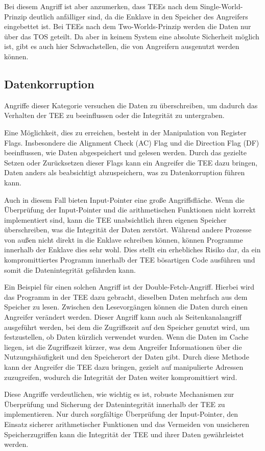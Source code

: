 Bei diesem Angriff ist aber anzumerken, dass TEEs nach dem Single-World-Prinzip deutlich anfälliger sind, da die Enklave in den Speicher des Angreifers eingebettet ist. Bei TEEs nach dem Two-Worlds-Prinzip werden die Daten nur über das TOS geteilt. Da aber in keinem System eine absolute Sicherheit möglich ist, gibt es auch hier Schwachstellen, die von Angreifern ausgenutzt werden können.

\subsection{Datenkorruption}
Angriffe dieser Kategorie versuchen die Daten zu überschreiben, um dadurch das Verhalten der TEE zu beeinflussen oder die Integrität zu untergraben.

Eine Möglichkeit, dies zu erreichen, besteht in der Manipulation von Register Flags. Insbesondere die Alignment Check (AC) Flag und die Direction Flag (DF) beeinflussen, wie Daten abgespeichert und gelesen werden. Durch das gezielte Setzen oder Zurücksetzen dieser Flags kann ein Angreifer die TEE dazu bringen, Daten anders als beabsichtigt abzuspeichern, was zu Datenkorruption führen kann.

Auch in diesem Fall bieten Input-Pointer eine große Angriffsfläche. Wenn die Überprüfung der Input-Pointer und die arithmetischen Funktionen nicht korrekt implementiert sind, kann die TEE unabsichtlich ihren eigenen Speicher überschreiben, was die Integrität der Daten zerstört. Während andere Prozesse von außen nicht direkt in die Enklave schreiben können, können Programme innerhalb der Enklave dies sehr wohl. Dies stellt ein erhebliches Risiko dar, da ein kompromittiertes Programm innerhalb der TEE bösartigen Code ausführen und somit die Datenintegrität gefährden kann.

Ein Beispiel für einen solchen Angriff ist der Double-Fetch-Angriff. Hierbei wird das Programm in der TEE dazu gebracht, dieselben Daten mehrfach aus dem Speicher zu lesen. Zwischen den Lesevorgängen können die Daten durch einen Angreifer verändert werden. Dieser Angriff kann auch als Seitenkanalangriff ausgeführt werden, bei dem die Zugriffszeit auf den Speicher genutzt wird, um festzustellen, ob Daten kürzlich verwendet wurden. Wenn die Daten im Cache liegen, ist die Zugriffszeit kürzer, was dem Angreifer Informationen über die Nutzungshäufigkeit und den Speicherort der Daten gibt. Durch diese Methode kann der Angreifer die TEE dazu bringen, gezielt auf manipulierte Adressen zuzugreifen, wodurch die Integrität der Daten weiter kompromittiert wird.

Diese Angriffe verdeutlichen, wie wichtig es ist, robuste Mechanismen zur Überprüfung und Sicherung der Datenintegrität innerhalb der TEE zu implementieren. Nur durch sorgfältige Überprüfung der Input-Pointer, den Einsatz sicherer arithmetischer Funktionen und das Vermeiden von unsicheren Speicherzugriffen kann die Integrität der TEE und ihrer Daten gewährleistet werden.

